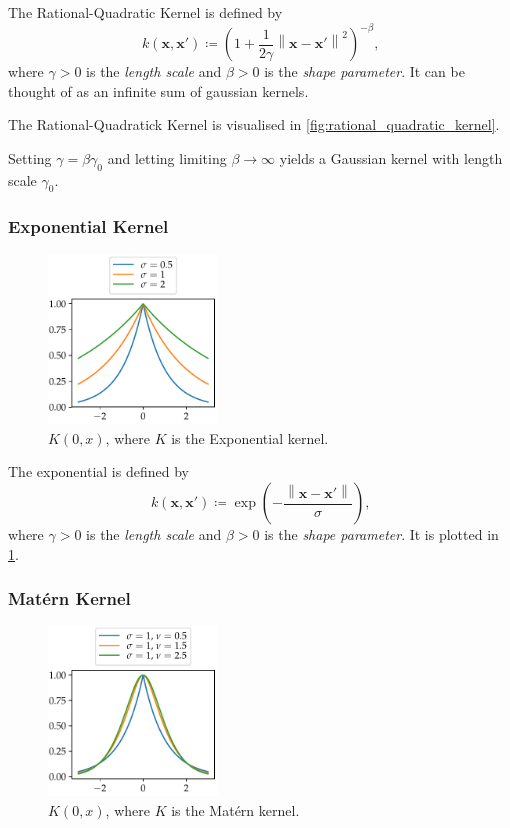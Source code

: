 \documentclass[11pt,twoside]{report}
\newcommand\bx{\mathbf{x}}
\newcommand\norm[1]{\left\|#1\right\|}
\begin{document}
The Rational-Quadratic Kernel is defined by \[
    k(\bx, \bx') \coloneqq \left(1 + \frac{1}{2\gamma}\norm{\bx - \bx'}^2\right)^{-\beta} \text{,}
\] where $\gamma > 0$ is the \textit{length scale} and $\beta > 0$ is the \textit{shape parameter}. It can be thought of as an infinite sum of gaussian kernels.

The Rational-Quadratick Kernel is visualised in \cref{fig:rational_quadratic_kernel}.

Setting $\gamma = \beta \gamma_0$ and letting limiting $\beta \to \infty$ yields a Gaussian kernel with length scale $\gamma_0$.

\subsubsection{Exponential Kernel}
  \begin{figure}
    \centering
    \includegraphics[width=0.4\textwidth]{exponential_kernel_plot.pdf}
    \caption{$K(0, x)$, where $K$ is the Exponential kernel.}
    \label{fig:exponential_kernel}
  \end{figure}

  The exponential is defined by \[
    k(\bx, \bx') \coloneqq \exp\left( - \frac{\norm{\bx - \bx'}}{\sigma} \right) \text{,}
  \] where $\gamma > 0$ is the \textit{length scale} and $\beta > 0$ is the \textit{shape parameter}. It is plotted in \cref{fig:exponential_kernel}.


\subsubsection{Mat\'ern Kernel}

  \begin{figure}
    \centering
    \includegraphics[width=0.4\textwidth]{matern_kernel_plot.pdf}
    \caption{$K(0, x)$, where $K$ is the Mat\'ern kernel.}
    \label{fig:matern_kernel}
  \end{figure}
\end{document}

